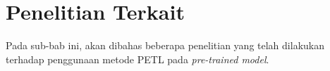 \section{Penelitian Terkait}

Pada sub-bab ini, akan dibahas beberapa penelitian yang telah dilakukan terhadap penggunaan metode PETL pada \textit{pre-trained model}.